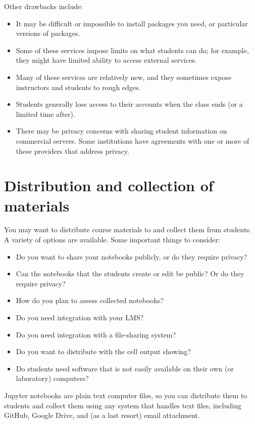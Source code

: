 \documentclass[]{book}
\begin{document}
Other drawbacks include:

\begin{itemize}
\item
  It may be difficult or impossible to install packages you need, or
  particular versions of packages.
\item
  Some of these services impose limits on what students can do; for
  example, they might have limited ability to access external
  services.
\item
  Many of these services are relatively new, and they sometimes expose
  instructors and students to rough edges.
\item
  Students generally lose access to their accounts when the class ends
  (or a limited time after).
\item
  There may be privacy concerns with sharing student information on
  commercial servers. Some institutions have agreements with one or
  more of these providers that address privacy.
\end{itemize}

\hypertarget{distribution-and-collection-of-materials}{%
\section{Distribution and collection of materials}\label{distribution-and-collection-of-materials}}

You may want to distribute course materials to and collect them from
students. A variety of options are available. Some important things
to consider:

\begin{itemize}
\item
  Do you want to share your notebooks publicly, or do they require
  privacy?
\item
  Can the notebooks that the students create or edit be public? Or do
  they require privacy?
\item
  How do you plan to assess collected notebooks?
\item
  Do you need integration with your LMS?
\item
  Do you need integration with a file-sharing system?
\item
  Do you want to distribute with the cell output showing?
\item
  Do students need software that is not easily available on their own
  (or laboratory) computers?
\end{itemize}

Jupyter notebooks are plain text computer files, so you can distribute
them to students and collect them using any system that handles text
files, including GitHub, Google Drive, and (as a last resort) email attachment.
\end{document}
